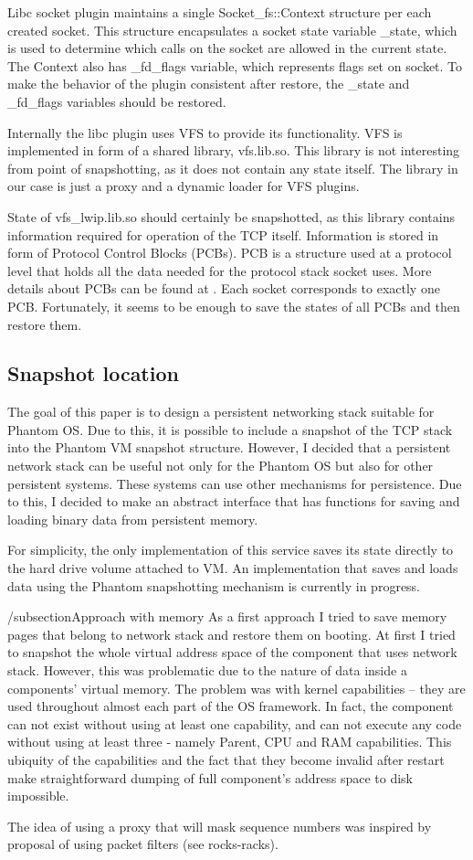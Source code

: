 Libc socket plugin maintains a single Socket\_fs::Context structure per each
created socket. This structure encapsulates a socket state variable \_state,
which is used to determine which calls on the socket are allowed in the current
state. The Context also has \_fd\_flags variable, which represents flags set on
socket. To make the behavior of the plugin consistent after restore, the \_state
and \_fd\_flags variables should be restored.

Internally the libc plugin uses VFS to provide its functionality. VFS is
implemented in form of a shared library, vfs.lib.so. This library is not
interesting from point of snapshotting, as it does not contain any state
itself.  The library in our case is just a proxy and a dynamic loader for VFS
plugins.

State of vfs\_lwip.lib.so should certainly be snapshotted, as this library
contains information required for operation of the TCP itself. Information is
stored in form of Protocol Control Blocks (PCBs). PCB is a structure used at a
protocol level that holds all the data needed for the protocol stack socket
uses. More details about PCBs can be found at \cite{stevens1996tcp}. Each
socket corresponds to exactly one PCB. Fortunately, it seems to be enough to
save the states of all PCBs and then restore them.

\subsection{Snapshot location}

The goal of this paper is to design a persistent networking stack suitable for
Phantom OS. Due to this, it is possible to include a snapshot of the TCP stack
into the Phantom VM snapshot structure. However, I decided that a persistent
network stack can be useful not only for the Phantom OS but also for other
persistent systems. These systems can use other mechanisms for persistence. Due
to this, I decided to make an abstract interface that has functions for saving
and loading binary data from persistent memory.

For simplicity, the only implementation of this service saves its state
directly to the hard drive volume attached to VM. An implementation that saves
and loads data using the Phantom snapshotting mechanism is currently in
progress.

/subsection{Approach with memory}
As a first approach I tried to save memory pages that belong to network stack and 
restore them on booting. At first I tried to snapshot the whole virtual address
space of the component that uses network stack. However, this was problematic
due to the nature of data inside a components' virtual memory. The problem was
with kernel capabilities -- they are used throughout almost each part of the OS
framework. In fact, the component can not exist without using at least one
capability, and can not execute any code without using at least three - namely 
Parent, CPU and RAM capabilities. This ubiquity of the capabilities and the fact
that they become invalid after restart make straightforward dumping of full
component's address space to disk impossible.

The idea of using a proxy that will mask sequence numbers was inspired by
proposal of using packet filters (see rocks-racks).
